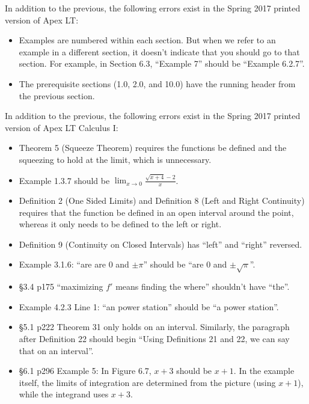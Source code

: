 \documentclass{amsart}
\newcommand{\ds}{\displaystyle}
\begin{document}
\clearpage

\newcommand{\springerrors}{%
In addition to the previous, the following errors exist in the Spring 2017 printed version of Apex LT:
\begin{itemize}
\item Examples are numbered within each section.  But when we refer to an example in a different section, it doesn't indicate that you should go to that section.  For example, in Section 6.3, ``Example 7'' should be ``Example 6.2.7''.
\item The prerequisite sections (1.0, 2.0, and 10.0) have the running header from the previous section.
\end{itemize}} %

\springerrors

In addition to the previous, the following errors exist in the Spring 2017 printed version of Apex LT Calculus I:
\begin{itemize}
\item Theorem 5 (Squeeze Theorem) requires the functions be defined and the squeezing to hold at the limit, which is unnecessary.\vspace{-.5\baselineskip}
\item Example 1.3.7 should be $\ds \lim_{x\to 0} \frac{\sqrt{x+4}-2}{x}$.
\item Definition 2 (One Sided Limits) and Definition 8 (Left and Right Continuity) requires that the function be defined in an open interval around the point, whereas it only needs to be defined to the left or right.
\item Definition 9 (Continuity on Closed Intervals) has ``left'' and ``right'' reversed.
\item Example 3.1.6: ``are are $0$ and $\pm\pi$'' should be ``are $0$ and $\pm\sqrt\pi$''.
\item \S3.4 p175 ``maximizing $f'$ means finding the where'' shouldn't have ``the''.
\item Example 4.2.3 Line 1: ``an power station'' should be ``a power station''.
\item \S5.1 p222 Theorem 31 only holds on an interval.  Similarly, the paragraph after Definition 22 should begin ``Using Definitions 21 and 22, we can say that on an interval''.
\item \S6.1 p296 Example 5: In Figure 6.7, $x+3$ should be $x+1$.  In the example itself, the limits of integration are determined from the picture (using $x+1$), while the integrand uses $x+3$.
\end{itemize}
\end{document}
